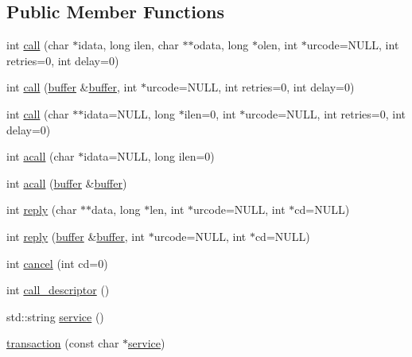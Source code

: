 \subsection*{Public Member Functions}
\begin{DoxyCompactItemize}
\item 
int \hyperlink{classatmi_1_1transaction_a1251381692ec4e235ca9179a84273484}{call} (char $\ast$idata, long ilen, char $\ast$$\ast$odata, long $\ast$olen, int $\ast$urcode=N\+U\+L\+L, int retries=0, int delay=0)
\item 
int \hyperlink{classatmi_1_1transaction_afc2bebb88fb56466d0a41d45e6060377}{call} (\hyperlink{classatmi_1_1buffer}{buffer} \&\hyperlink{classatmi_1_1buffer}{buffer}, int $\ast$urcode=N\+U\+L\+L, int retries=0, int delay=0)
\item 
int \hyperlink{classatmi_1_1transaction_aa5fb9edab0ee78c39b73936ca59a0b02}{call} (char $\ast$$\ast$idata=N\+U\+L\+L, long $\ast$ilen=0, int $\ast$urcode=N\+U\+L\+L, int retries=0, int delay=0)
\item 
int \hyperlink{classatmi_1_1transaction_abf3ecf74af155274d4b500df2e6ec69b}{acall} (char $\ast$idata=N\+U\+L\+L, long ilen=0)
\item 
int \hyperlink{classatmi_1_1transaction_a3abfbaad23aafaccd6b96af66d36e329}{acall} (\hyperlink{classatmi_1_1buffer}{buffer} \&\hyperlink{classatmi_1_1buffer}{buffer})
\item 
int \hyperlink{classatmi_1_1transaction_a810c7fdad2bc26722027d4d0565f4c9a}{reply} (char $\ast$$\ast$data, long $\ast$len, int $\ast$urcode=N\+U\+L\+L, int $\ast$cd=N\+U\+L\+L)
\item 
int \hyperlink{classatmi_1_1transaction_a3bcbf7ec6d3b9909e10368ffb6e3d39d}{reply} (\hyperlink{classatmi_1_1buffer}{buffer} \&\hyperlink{classatmi_1_1buffer}{buffer}, int $\ast$urcode=N\+U\+L\+L, int $\ast$cd=N\+U\+L\+L)
\item 
int \hyperlink{classatmi_1_1transaction_a380d536258d33a801973100d6e2ae622}{cancel} (int cd=0)
\item 
int \hyperlink{classatmi_1_1transaction_a11018dd9689a5a66d0510ae78bb048da}{call\+\_\+descriptor} ()
\item 
std\+::string \hyperlink{classatmi_1_1transaction_a04ce5f63ca8115964cd952c086221526}{service} ()
\item 
\hyperlink{classatmi_1_1transaction_a0cb59a4954d3fc4b903c0f2876dd00b3}{transaction} (const char $\ast$\hyperlink{classatmi_1_1transaction_a04ce5f63ca8115964cd952c086221526}{service})
\end{DoxyCompactItemize}
